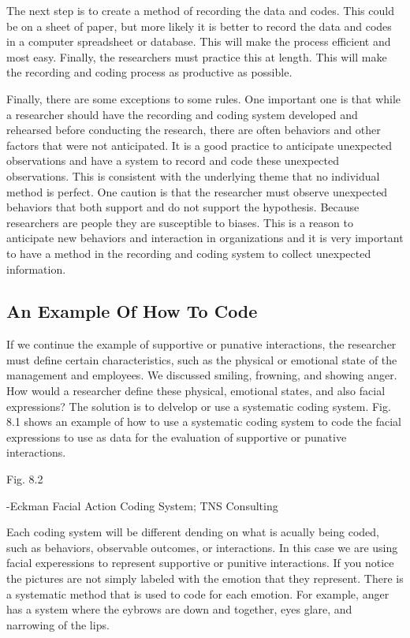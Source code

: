 \documentclass[]{book}
\theoremstyle{definition}
\theoremstyle{definition}
\theoremstyle{definition}
\theoremstyle{remark}
\begin{document}
The next step is to create a method of recording the data and codes.
This could be on a sheet of paper, but more likely it is better to
record the data and codes in a computer spreadsheet or database. This
will make the process efficient and most easy. Finally, the researchers
must practice this at length. This will make the recording and coding
process as productive as possible.

Finally, there are some exceptions to some rules. One important one is
that while a researcher should have the recording and coding system
developed and rehearsed before conducting the research, there are often
behaviors and other factors that were not anticipated. It is a good
practice to anticipate unexpected observations and have a system to
record and code these unexpected observations. This is consistent with
the underlying theme that no individual method is perfect. One caution
is that the researcher must observe unexpected behaviors that both
support and do not support the hypothesis. Because researchers are
people they are susceptible to biases. This is a reason to anticipate
new behaviors and interaction in organizations and it is very important
to have a method in the recording and coding system to collect
unexpected information.

\hypertarget{an-example-of-how-to-code}{%
\subsection{An Example Of How To Code}\label{an-example-of-how-to-code}}

If we continue the example of supportive or punative interactions, the
researcher must define certain characteristics, such as the physical or
emotional state of the management and employees. We discussed smiling,
frowning, and showing anger. How would a researcher define these
physical, emotional states, and also facial expressions? The solution is
to delvelop or use a systematic coding system. Fig. 8.1 shows an example
of how to use a systematic coding system to code the facial expressions
to use as data for the evaluation of supportive or punative
interactions.

Fig. 8.2

-Eckman Facial Action Coding System; TNS Consulting

Each coding system will be different dending on what is acually being
coded, such as behaviors, observable outcomes, or interactions. In this
case we are using facial experessions to represent supportive or
punitive interactions. If you notice the pictures are not simply labeled
with the emotion that they represent. There is a systematic method that
is used to code for each emotion. For example, anger has a system where
the eybrows are down and together, eyes glare, and narrowing of the
lips.
\end{document}
